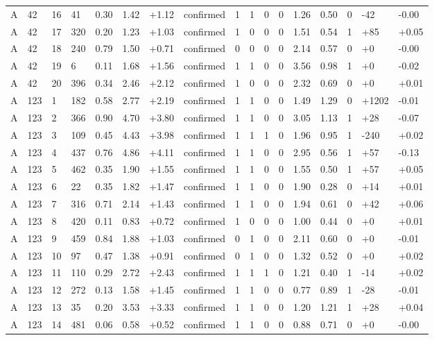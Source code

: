 \documentclass[11pt,a4paper]{article}
\begin{document}
{\begin{longtable}[]{@{}lllllllllllllllll@{}}
A & 42 & 16 & 41 & 0.30 & 1.42 & +1.12 & confirmed & 1 & 1 & 0 & 0 & 1.26 & 0.50 & 0 & -42 & -0.00 \\
A & 42 & 17 & 320 & 0.20 & 1.23 & +1.03 & confirmed & 1 & 0 & 0 & 0 & 1.51 & 0.54 & 1 & +85 & +0.05 \\
A & 42 & 18 & 240 & 0.79 & 1.50 & +0.71 & confirmed & 0 & 0 & 0 & 0 & 2.14 & 0.57 & 0 & +0 & -0.00 \\
A & 42 & 19 & 6 & 0.11 & 1.68 & +1.56 & confirmed & 1 & 1 & 0 & 0 & 3.56 & 0.98 & 1 & +0 & -0.02 \\
A & 42 & 20 & 396 & 0.34 & 2.46 & +2.12 & confirmed & 1 & 0 & 0 & 0 & 2.32 & 0.69 & 0 & +0 & +0.01 \\
A & 123 & 1 & 182 & 0.58 & 2.77 & +2.19 & confirmed & 1 & 1 & 0 & 0 & 1.49 & 1.29 & 0 & +1202 & -0.01 \\
A & 123 & 2 & 366 & 0.90 & 4.70 & +3.80 & confirmed & 1 & 1 & 0 & 0 & 3.05 & 1.13 & 1 & +28 & -0.07 \\
A & 123 & 3 & 109 & 0.45 & 4.43 & +3.98 & confirmed & 1 & 1 & 1 & 0 & 1.96 & 0.95 & 1 & -240 & +0.02 \\
A & 123 & 4 & 437 & 0.76 & 4.86 & +4.11 & confirmed & 1 & 1 & 0 & 0 & 2.95 & 0.56 & 1 & +57 & -0.13 \\
A & 123 & 5 & 462 & 0.35 & 1.90 & +1.55 & confirmed & 1 & 1 & 0 & 0 & 1.55 & 0.50 & 1 & +57 & +0.05 \\
A & 123 & 6 & 22 & 0.35 & 1.82 & +1.47 & confirmed & 1 & 1 & 0 & 0 & 1.90 & 0.28 & 0 & +14 & +0.01 \\
A & 123 & 7 & 316 & 0.71 & 2.14 & +1.43 & confirmed & 1 & 1 & 0 & 0 & 1.94 & 0.61 & 0 & +42 & +0.06 \\
A & 123 & 8 & 420 & 0.11 & 0.83 & +0.72 & confirmed & 1 & 0 & 0 & 0 & 1.00 & 0.44 & 0 & +0 & +0.01 \\
A & 123 & 9 & 459 & 0.84 & 1.88 & +1.03 & confirmed & 0 & 1 & 0 & 0 & 2.11 & 0.60 & 0 & +0 & -0.01 \\
A & 123 & 10 & 97 & 0.47 & 1.38 & +0.91 & confirmed & 0 & 1 & 0 & 0 & 1.32 & 0.52 & 0 & +0 & +0.02 \\
A & 123 & 11 & 110 & 0.29 & 2.72 & +2.43 & confirmed & 1 & 1 & 1 & 0 & 1.21 & 0.40 & 1 & -14 & +0.02 \\
A & 123 & 12 & 272 & 0.13 & 1.58 & +1.45 & confirmed & 1 & 1 & 0 & 0 & 0.77 & 0.89 & 1 & -28 & -0.01 \\
A & 123 & 13 & 35 & 0.20 & 3.53 & +3.33 & confirmed & 1 & 1 & 0 & 0 & 1.20 & 1.21 & 1 & +28 & +0.04 \\
A & 123 & 14 & 481 & 0.06 & 0.58 & +0.52 & confirmed & 1 & 1 & 0 & 0 & 0.88 & 0.71 & 0 & +0 & -0.00 \\

\end{longtable}}
\end{document}
